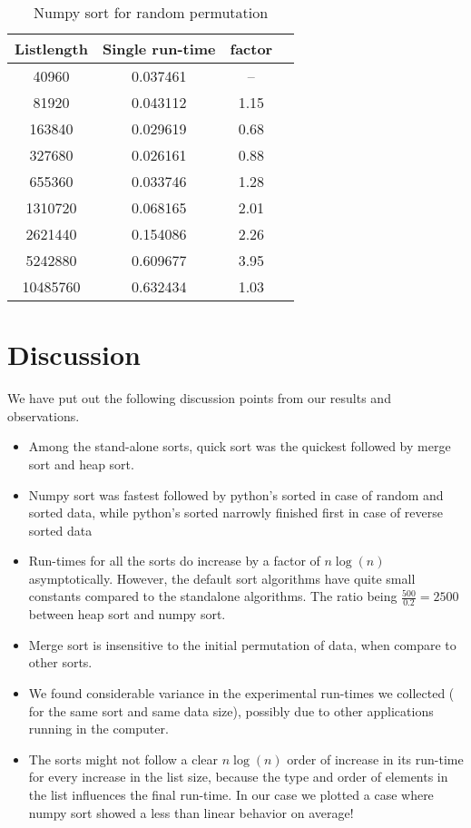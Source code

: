 \documentclass[sigconf, nonacm, natbib, screen, balance=False]{acmart}
\begin{document}
\begin{table}[ht]
\caption{Numpy sort for random permutation }
\label{tab:table3}
\begin{center}
\begin{tabular}{|c|c|c|c|} 
\hline
\textbf{Listlength} & 	\textbf{Single run-time} & \textbf{factor} \\ 
\hline
40960 & 	0.037461 & --	 \\ 
81920 & 	0.043112 & 	1.15 \\ 
163840 & 	0.029619 & 	0.68 \\ 
327680 & 	0.026161 & 	0.88 \\ 
655360 & 	0.033746 & 	1.28 \\ 
1310720 & 	0.068165 & 	2.01 \\ 
2621440 & 	0.154086 & 	2.26 \\ 
5242880 & 	0.609677 & 	3.95 \\ 
10485760 & 	0.632434 & 	1.03 \\ 

\hline
\end{tabular}
\end{center}
\end{table}

\section{Discussion}\label{sec:discussion}
We have put out the following discussion points from our results and observations.

\begin{itemize}
\item Among the stand-alone sorts, quick sort was the quickest followed by merge sort and heap sort.
\item Numpy sort was fastest followed by python's sorted in case of random and sorted data, while python's sorted narrowly finished first in case of reverse sorted data
\item Run-times for all the sorts do increase by a factor of $n\log(n)$ asymptotically. However, the default sort algorithms have quite small constants compared to the standalone algorithms. The ratio being $\frac{500}{0.2} = 2500$ between heap sort and numpy sort.
\item Merge sort is insensitive to the initial permutation of data, when compare to other sorts.
\item We found considerable variance in the experimental run-times we collected ( for the same sort and same data size), possibly due to other applications running in the computer.
\item The sorts might not follow a clear $n\log(n)$ order of increase in its run-time for every increase in the list size, because the type and order of elements in the list influences the final run-time. In our case we plotted a case where numpy sort showed a less than linear behavior on average!
\end{itemize}
\end{document}
